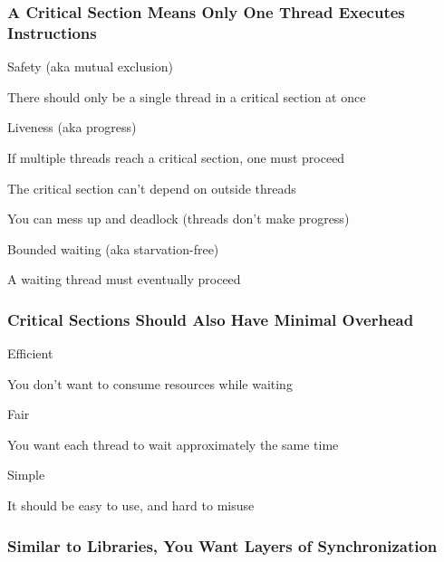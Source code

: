   \begin{frame}
    \frametitle{A Critical Section Means Only One Thread Executes Instructions}

    Safety (aka mutual exclusion)

    \hspace{2em} There should only be a single thread in a critical section at
    once

    \vspace{2em}

    Liveness (aka progress)

    \hspace{2em} If multiple threads reach a critical section, one must proceed

    \hspace{2em} The critical section can't depend on outside threads

    \hspace{4em} You can mess up and deadlock (threads don't make progress)

    \vspace{2em}

    Bounded waiting (aka starvation-free)

    \hspace{2em} A waiting thread must eventually proceed
  \end{frame}

  \begin{frame}
    \frametitle{Critical Sections Should Also Have Minimal Overhead}

    Efficient

    \hspace{2em} You don't want to consume resources while waiting

    \vspace{2em}

    Fair

    \hspace{2em} You want each thread to wait approximately the same time

    \vspace{2em}

    Simple

    \hspace{2em} It should be easy to use, and hard to misuse
  \end{frame}

  \begin{frame}
    \frametitle{Similar to Libraries, You Want Layers of Synchronization}

    \centering
  \end{frame}

